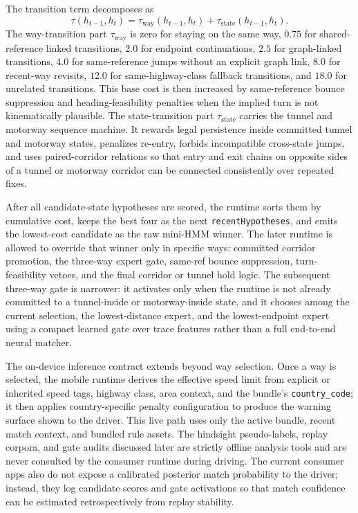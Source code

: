 \documentclass{article}
\begin{document}
The transition term decomposes as
\[
\tau(h_{t-1}, h_t) = \tau_{\mathrm{way}}(h_{t-1}, h_t) + \tau_{\mathrm{state}}(h_{t-1}, h_t).
\]
The way-transition part \(\tau_{\mathrm{way}}\) is zero for staying on the same way, \(0.75\) for shared-reference linked transitions, \(2.0\) for endpoint continuations, \(2.5\) for graph-linked transitions, \(4.0\) for same-reference jumps without an explicit graph link, \(8.0\) for recent-way revisits, \(12.0\) for same-highway-class fallback transitions, and \(18.0\) for unrelated transitions. This base cost is then increased by same-reference bounce suppression and heading-feasibility penalties when the implied turn is not kinematically plausible. The state-transition part \(\tau_{\mathrm{state}}\) carries the tunnel and motorway sequence machine. It rewards legal persistence inside committed tunnel and motorway states, penalizes re-entry, forbids incompatible cross-state jumps, and uses paired-corridor relations so that entry and exit chains on opposite sides of a tunnel or motorway corridor can be connected consistently over repeated fixes.

After all candidate-state hypotheses are scored, the runtime sorts them by cumulative cost, keeps the best four as the next \texttt{recentHypotheses}, and emits the lowest-cost candidate as the raw mini-HMM winner. The later runtime is allowed to override that winner only in specific ways: committed corridor promotion, the three-way expert gate, same-ref bounce suppression, turn-feasibility vetoes, and the final corridor or tunnel hold logic. The subsequent three-way gate is narrower: it activates only when the runtime is not already committed to a tunnel-inside or motorway-inside state, and it chooses among the current selection, the lowest-distance expert, and the lowest-endpoint expert using a compact learned gate over trace features rather than a full end-to-end neural matcher.

The on-device inference contract extends beyond way selection. Once a way is selected, the mobile runtime derives the effective speed limit from explicit or inherited speed tags, highway class, area context, and the bundle's \texttt{country\_code}; it then applies country-specific penalty configuration to produce the warning surface shown to the driver. This live path uses only the active bundle, recent match context, and bundled rule assets. The hindsight pseudo-labels, replay corpora, and gate audits discussed later are strictly offline analysis tools and are never consulted by the consumer runtime during driving. The current consumer apps also do not expose a calibrated posterior match probability to the driver; instead, they log candidate scores and gate activations so that match confidence can be estimated retrospectively from replay stability.
\end{document}
